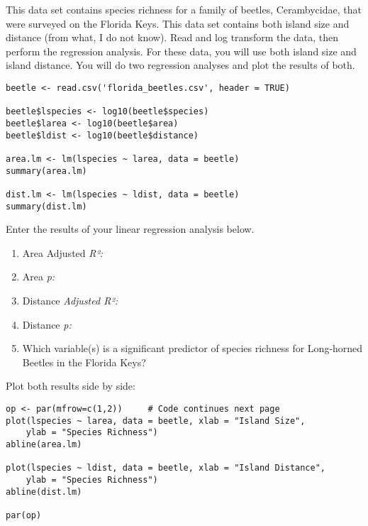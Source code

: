 \documentclass[11pt]{article}
\begin{document}
This data set contains species richness for a family of beetles, Cerambycidae, that were surveyed on the Florida Keys. This data set contains both island size and distance (from what, I do not know).  Read and log transform the data, then perform the regression analysis.  For these data, you will use both island size and island distance.  You will do two regression analyses and plot the results of both.

\begin{verbatim}
beetle <- read.csv('florida_beetles.csv', header = TRUE)

beetle$lspecies <- log10(beetle$species)
beetle$larea <- log10(beetle$area)
beetle$ldist <- log10(beetle$distance)

area.lm <- lm(lspecies ~ larea, data = beetle)
summary(area.lm)

dist.lm <- lm(lspecies ~ ldist, data = beetle)
summary(dist.lm)
\end{verbatim}

Enter the results of your linear regression analysis below.

\begin{enumerate}
	\item  Area Adjusted \textit{R²:} 
	
	\item Area \textit{p:}

	\item  Distance \textit{Adjusted R²:} 
	
	\item Distance \textit{p:}
	
	\item Which variable(s) is a significant predictor of species richness for Long-horned Beetles in the Florida Keys?
\end{enumerate}

\vspace{4\baselineskip}

Plot both results side by side:

\begin{verbatim}
op <- par(mfrow=c(1,2))     # Code continues next page
plot(lspecies ~ larea, data = beetle, xlab = "Island Size",
    ylab = "Species Richness")
abline(area.lm)

plot(lspecies ~ ldist, data = beetle, xlab = "Island Distance",
    ylab = "Species Richness")
abline(dist.lm)

par(op)
\end{verbatim}

\smallskip
\end{document}
